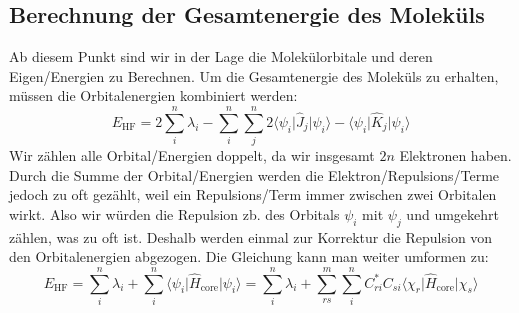\subsection{Berechnung der Gesamtenergie des Moleküls}
Ab diesem Punkt sind wir in der Lage die Molekülorbitale und
deren Eigen\-/Energien zu Berechnen. Um die Gesamtenergie des Moleküls zu erhalten,
müssen die Orbitalenergien kombiniert werden:
\begin{equation}
    E_{\text{HF}} = 2 \sum_i^n \lambda_i - \sum_i^n \sum_j^n
    2 \langle \psi_i \vert \hat{J}_j \vert \psi_i \rangle
    - \langle \psi_i \vert \hat{K}_j \vert \psi_i \rangle
\end{equation}
Wir zählen alle Orbital\-/Energien doppelt, da wir insgesamt $2n$ Elektronen haben.
Durch die Summe der Orbital\-/Energien werden die Elektron\-/Repulsions\-/Terme
jedoch zu oft gezählt, weil ein Repulsions\-/Term immer zwischen zwei Orbitalen wirkt.
Also wir würden die Repulsion zb. des Orbitals $\psi_i$ mit $\psi_j$ und umgekehrt zählen,
was zu oft ist.
Deshalb werden einmal zur Korrektur die Repulsion von den Orbitalenergien abgezogen.
Die Gleichung kann man weiter umformen zu:
\begin{equation}
    E_{\text{HF}} = \sum_i^n \lambda_i
    + \sum_i^n \langle \psi_i \vert \hat{H}_{\text{core}} \vert \psi_i \rangle
    = \sum_i^n \lambda_i
    + \sum_{rs}^m \sum_i^{n} C_{ri}^*C_{si}
    \langle \chi_r \vert \hat{H}_{\text{core}} \vert \chi_s \rangle
\end{equation}

\cite[S. 229-230]{lewars_2016}



